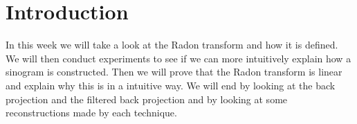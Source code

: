 \section{Introduction}
In this week we will take a look at the Radon transform and how it is defined. We will then conduct experiments to see if we can more intuitively explain how a sinogram is constructed. Then we will prove that the Radon transform is linear and explain why this is in a intuitive way. We will end by looking at the back projection and the filtered back projection and by looking at some reconstructions made by each technique.